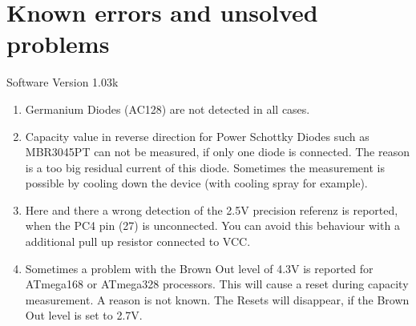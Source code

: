 
\chapter{Known errors and unsolved problems}
{\center Software Version 1.03k}

\begin{enumerate}

\item Germanium Diodes (AC128) are not detected in all cases.

\item Capacity value in reverse direction for Power Schottky Diodes such as MBR3045PT can not be measured,
if only one diode is connected. The reason is a too big residual current of this diode.
Sometimes the measurement is possible by cooling down the device (with  cooling spray for example).

\item Here and there  a wrong detection of the 2.5V precision referenz is reported, when the PC4 pin (27) is unconnected.
You can avoid this behaviour with a additional pull up resistor connected to VCC.

\item Sometimes a problem with the Brown Out level of 4.3V is reported for ATmega168 or ATmega328 processors.
This will cause a reset during capacity measurement. A reason is not known.
The Resets will disappear, if the Brown Out level is set to 2.7V.

\end{enumerate}
